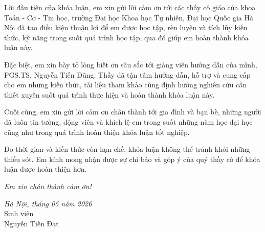 Lời đầu tiên của khóa luận, em xin gửi lời cảm ơn tới các thầy cô giáo của khoa Toán - Cơ - Tin học, trường Đại học Khoa học Tự nhiên, Đại học Quốc gia Hà Nội đã tạo điều kiện thuận lợi để em được học tập, rèn luyện và tích lũy kiến thức, kỹ năng trong suốt quá trình học tập, qua đó giúp em hoàn thành khóa luận này.

Đặc biệt, em xin bày tỏ lòng biết ơn sâu sắc tới giảng viên hướng dẫn của mình, PGS.TS. Nguyễn Tiến Dũng. Thầy đã tận tâm hướng dẫn, hỗ trợ và cung cấp cho em những kiến thức, tài liệu tham khảo cùng định hướng nghiên cứu cần thiết xuyên suốt quá trình thực hiện và hoàn thành khóa luận này.

Cuối cùng, em xin gửi lời cảm ơn chân thành tới gia đình và bạn bè, những người đã luôn tin tưởng, động viên và khích lệ em trong suốt những năm học đại học cũng như trong quá trình hoàn thiện khóa luận tốt nghiệp.

Do thời gian và kiến thức còn hạn chế, khóa luận không thể tránh khỏi những thiếu sót. Em kính mong nhận được sự chỉ bảo và góp ý của quý thầy cô để khóa luận được hoàn thiện hơn.

\textit{Em xin chân thành cảm ơn!}

\begin{flushright}
    \textit{Hà Nội, tháng 05 năm 2026} \\
    Sinh viên\\
    Nguyễn Tiến Đạt
\end{flushright}